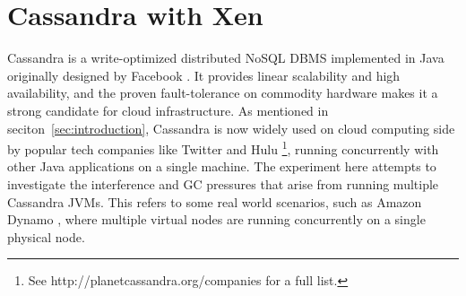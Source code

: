 \documentclass{sig-alternate}
\begin{document}


\section{Cassandra with Xen}

Cassandra is a write-optimized distributed NoSQL DBMS implemented in Java originally designed by Facebook \cite{lakshman2010cassandra}. It provides linear scalability and high availability, and the proven fault-tolerance on commodity hardware makes it a strong candidate for cloud infrastructure. As mentioned in seciton~\ref{sec:introduction}, Cassandra is now widely used on cloud computing side by popular tech companies like Twitter and Hulu \footnote{See http://planetcassandra.org/companies for a full list.}, running concurrently with other Java applications on a single machine. The experiment here attempts to investigate the interference and GC pressures that arise from running multiple Cassandra JVMs. This refers to some real world scenarios, such as Amazon Dynamo \cite{hastorun2007dynamo}, where multiple virtual nodes are running concurrently on a single physical node.
\end{document}
